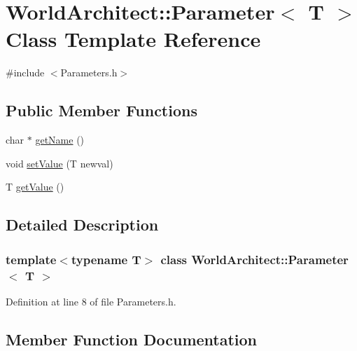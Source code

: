 \hypertarget{class_world_architect_1_1_parameter}{}\section{World\+Architect\+::Parameter$<$ T $>$ Class Template Reference}
\label{class_world_architect_1_1_parameter}


{\ttfamily \#include $<$Parameters.\+h$>$}

\subsection*{Public Member Functions}
\begin{DoxyCompactItemize}
\item 
char $\ast$ \mbox{\hyperlink{class_world_architect_1_1_parameter_aafe7ca969ebf94b465514ab1ac33e8ae}{get\+Name}} ()
\item 
void \mbox{\hyperlink{class_world_architect_1_1_parameter_a59fd2eabc743fafb1c5939eda372e441}{set\+Value}} (T newval)
\item 
T \mbox{\hyperlink{class_world_architect_1_1_parameter_a0a7c095a57b7fd88f04067344c28ef59}{get\+Value}} ()
\end{DoxyCompactItemize}


\subsection{Detailed Description}
\subsubsection*{template$<$typename T$>$\newline
class World\+Architect\+::\+Parameter$<$ T $>$}



Definition at line 8 of file Parameters.\+h.



\subsection{Member Function Documentation}
\mbox{\label{class_world_architect_1_1_parameter_aafe7ca969ebf94b465514ab1ac33e8ae}} 
